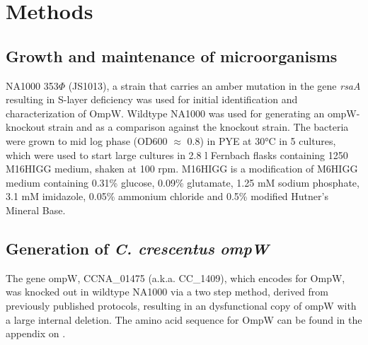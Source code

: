 \section{Methods}
\label{sec:porin_methods}
\subsection{Growth and maintenance of microorganisms} 
\label{sub:porin_growth}
\caulobacter NA1000 353$\Phi$ (JS1013), a strain that carries an amber mutation in the gene \textit{rsaA} resulting in S-layer deficiency was used for initial identification and characterization of OmpW. Wildtype \caulobacter NA1000 was used for generating an ompW-knockout strain and as a comparison against the knockout strain. The bacteria were  grown to mid log phase (\ac{OD600} $\approx$ 0.8) in \ac{PYE} at 30\si{\degreeCelsius} in 5 \millilitre cultures, which were used to start large cultures in 2.8 \si{\litre} Fernbach flasks containing 1250 \millilitre M16HIGG medium, shaken at 100 rpm. M16HIGG is a modification of M6HIGG medium containing 0.31\% glucose, 0.09\% glutamate, 1.25 mM sodium phosphate, 3.1 mM imidazole, 0.05\% ammonium chloride and 0.5\% modified Hutner's Mineral Base.

\subsection{Generation of \textit{C. crescentus} \del \textit{ompW}}
\label{sub:porin_knockout}
The gene ompW, CCNA\_01475 (a.k.a. CC\_1409), which encodes for OmpW, was knocked out in wildtype \caulobacter NA1000 via a two step method, derived from previously published protocols, resulting in an dysfunctional copy of ompW with a large internal deletion. The amino acid sequence for OmpW can be found in the appendix on .

